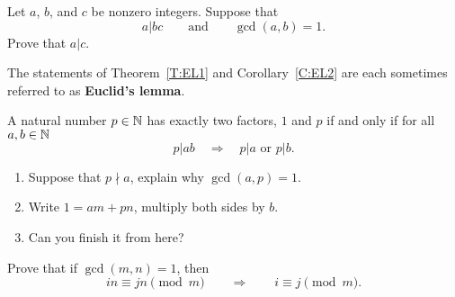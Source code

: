 \documentclass{ximera}
\begin{document}
\begin{corollary}\label{C:EL2}
  Let $a$, $b$, and $c$ be nonzero integers. Suppose that 
  \[
  a |bc\qquad\text{and}\qquad \gcd(a,b)=1.
  \]
  Prove that $a|c$. 
\end{corollary}


The statements of Theorem~\ref{T:EL1} and Corollary~\ref{C:EL2} are
each sometimes referred to as \textbf{Euclid's lemma}.



\begin{corollary}\label{E:EL}
  A natural number $p\in \mathbb N$ has exactly two factors, $1$ and $p$ if
  and only if for all $a,b\in\mathbb N$
  \[
  p|ab \quad \Rightarrow \quad p|a \text{ or } p|b.
  \]
  \begin{sketch}
  \begin{enumerate}
  \item Suppose that $p\nmid a$, explain why $\gcd(a,p) =1$.
  \item Write $1 = am + pn$, multiply both sides by $b$.
  \item Can you finish it from here?
  \end{enumerate}
  \end{sketch}
\end{corollary}






\begin{exercise} Prove that if $\gcd(m,n) = 1$, then 
\[
in \equiv jn \pmod m \qquad \Rightarrow\qquad i\equiv j\pmod m.
\]
\end{exercise}
\end{document}
